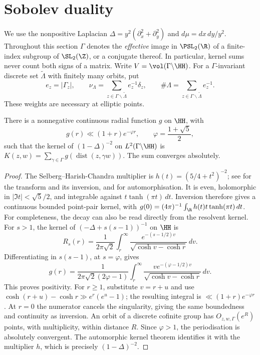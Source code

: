 \section{Sobolev duality}\label{sec:sobolev}
We use the nonpositive Laplacian
\(\Delta=y^2(\partial_x^2+\partial_y^2)\) and
\(d\mu=dx\,dy/y^2\). Throughout this section \(\Gamma\) denotes the
\emph{effective} image in \(\PSL_2(\R)\) of a finite-index subgroup of
\(\SL_2(\Z)\), or a conjugate thereof. In particular, kernel sums never
count both signs of a matrix. Write \(V=\vol(\Gamma\backslash\HH)\).
For a \(\Gamma\)-invariant discrete set \(\widetilde\Lambda\) with finitely
many orbits, put
\[
 e_z=|\Gamma_z|,\qquad
 \nu_\Lambda=\sum_{z\in\Gamma\backslash\widetilde\Lambda}e_z^{-1}\delta_z,
 \qquad \#\Lambda=\sum_{z\in\Gamma\backslash\widetilde\Lambda}e_z^{-1}.
\]
These weights are necessary at elliptic points.

\begin{lemma}\label{L:4.1}
There is a nonnegative continuous radial function \(g\) on \(\HH\), with
\[
 g(r)\ll(1+r)e^{-\varphi r},\qquad
 \varphi=\frac{1+\sqrt5}{2},
\]
such that the kernel of \((1-\Delta)^{-2}\) on
\(L^2(\Gamma\backslash\HH)\) is
\(K(z,w)=\sum_{\gamma\in\Gamma}g(\operatorname{dist}(z,\gamma w))\).
The sum converges absolutely.
\end{lemma}
\begin{proof}
The Selberg--Harish-Chandra multiplier is
\(h(t)=(5/4+t^2)^{-2}\); see \cite[\S1.8]{Iw} for the transform and its
inversion, and \cite[Theorem 1.14]{Iw} for automorphisation.
It is even, holomorphic in \(|\Im t|<\sqrt5/2\), and integrable against
\(t\tanh(\pi t)\,dt\). Inversion therefore gives a continuous bounded
point-pair kernel, with
\(g(0)=(4\pi)^{-1}\int_{\R}h(t)t\tanh(\pi t)\,dt\).
For completeness, the decay can also be read directly from the resolvent
kernel. For \(s>1\), the kernel of \((-\Delta+s(s-1))^{-1}\) on \(\HH\) is
\[
 R_s(r)=\frac1{2\pi\sqrt2}\int_r^\infty
       \frac{e^{-(s-1/2)v}}{\sqrt{\cosh v-\cosh r}}\,dv.
\]
Differentiating in \(s(s-1)\), at \(s=\varphi\), gives
\[
 g(r)=\frac1{2\pi\sqrt2(2\varphi-1)}
       \int_r^\infty\frac{v e^{-(\varphi-1/2)v}}
                            {\sqrt{\cosh v-\cosh r}}\,dv.
\]
This proves positivity. For \(r\ge1\), substitute \(v=r+u\) and use
\(\cosh(r+u)-\cosh r\gg e^r(e^u-1)\); the resulting integral is
\(\ll(1+r)e^{-\varphi r}\). At \(r=0\) the numerator cancels the
singularity, giving the same boundedness and continuity as inversion.
An orbit of a discrete cofinite group has \(O_{z,w,\Gamma}(e^R)\) points,
with multiplicity, within distance \(R\). Since \(\varphi>1\), the
periodisation is absolutely convergent. The automorphic kernel theorem
identifies it with the multiplier \(h\), which is precisely
\((1-\Delta)^{-2}\).
\end{proof}

